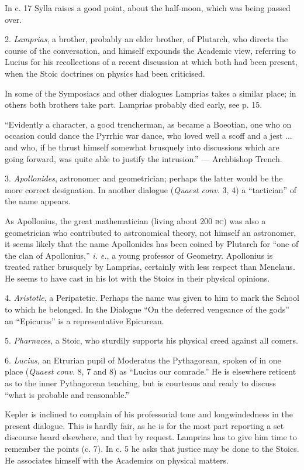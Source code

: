 \documentclass[a4paper, 11pt, oneside, polutonikogreek, english]{article}
\begin{document}
In c. 17 Sylla raises a good point, about the half-moon, which was being passed over.

2. \emph{Lamprias}, a brother, probably an elder brother, of Plutarch, who directs the course of the conversation, and himself expounds the Academic view, referring to Lucius for his recollections of a recent discussion at which both had been present, when the Stoic doctrines on physics had been criticised.

In some of the Symposiacs and other dialogues Lamprias takes a similar place; in others both brothers take part. Lamprias probably died early, see p. 15.

``Evidently a character, a good trencherman, as became a Boeotian, one who on occasion could dance the Pyrrhic war dance, who loved well a scoff and a jest ... and who, if he thrust himself somewhat brusquely into discussions which are going forward, was quite able to justify the intrusion.'' --- Archbishop Trench.

3. \emph{Apollonides}, astronomer and geometrician; perhaps the latter would be the more correct designation. In another dialogue (\emph{Quaest conv.} 3, 4) a ``tactician'' of the name appears.

As Apollonius, the great mathematician (living about 200 \textsc{bc}) was also a geometrician who contributed to astronomical theory, not himself an astronomer, it seems likely that the name Apollonides has been coined by Plutarch for ``one of the clan of Apollonius,'' \emph{i. e.}, a young professor of Geometry. Apollonius is treated rather brusquely by Lamprias, certainly with less respect than Menelaus. He seems to have cast in his lot with the Stoics in their physical opinions.

4. \emph{Aristotle}, a Peripatetic. Perhaps the name was given to him to mark the School to which he belonged. In the Dialogue ``On the deferred vengeance of the gods'' an ``Epicurus'' is a representative Epicurean.

5. \emph{Pharnaces}, a Stoic, who sturdily supports his physical creed against all comers.

6. \emph{Lucius}, an Etrurian pupil of Moderatus the Pythagorean, spoken of in one place (\emph{Quaest conv.} 8, 7 and 8) as ``Lucius our comrade.'' He is elsewhere reticent as to the inner Pythagorean teaching, but is courteous and ready to discuss ``what is probable and reasonable.''

Kepler is inclined to complain of his professorial tone and longwindedness in the present dialogue. This is hardly fair, as he is for the most part reporting a set discourse heard elsewhere, and that by request. Lamprias has to give him time to remember the points (c. 7). In c. 5 he asks that justice may be done to the Stoics. He associates himself with the Academics on physical matters.
\end{document}
